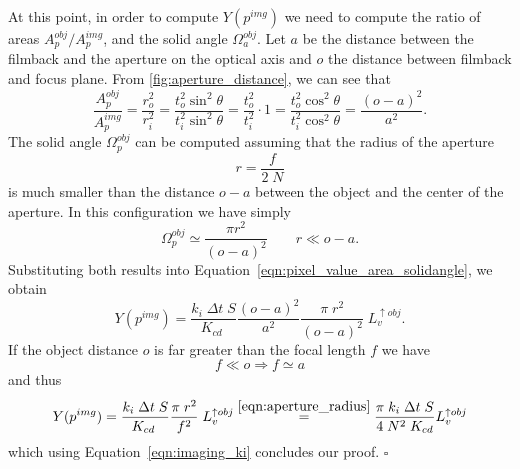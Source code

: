 At this point, in order to compute $Y(p^{img})$ we need to compute the ratio of
areas $A_p^{obj}/A_p^{img}$, and the solid angle $\Omega_a^{obj}$. Let $a$ be the distance between the filmback and the
aperture on the optical axis and $o$ the distance between filmback and focus
plane. From \cref{fig:aperture_distance}, we can see that
\begin{equation*}
    \frac{A_p^{obj}}{A^{img}_p}
    = \frac{r_o^2}{r_i^2}
    = \frac{t_o^2 \sin^2\theta}{t_i^2 \sin^2\theta}
    = \frac{t_o^2}{t_i^2} \cdot 1
    = \frac{t_o^2 \cos^2\theta}{t_i^2 \cos^2\theta}
    = \frac{(o-a)^2}{a^2}.
\end{equation*}
The solid angle $\Omega_p^{obj}$ can be computed assuming that the radius of the
aperture 
\begin{equation}\label{eqn:aperture_radius}
    r = \frac{f}{2\;N}
\end{equation}
is much smaller than the distance $o-a$ between the object
and the center of the aperture. In this configuration we have simply
\begin{equation}\label{eqn:imaging_omegapobj}
\Omega_p^{obj} \simeq \frac{\pi r^2}{(o-a)^2} \qquad r \ll o-a.
\end{equation}
Substituting both results into Equation~\eqref{eqn:pixel_value_area_solidangle}, we obtain
\begin{equation}\label{eqn:imaging_y2}
Y(p^{img}) =  \frac{k_i\; \Delta t \; S}{K_{cd}\;} \frac{(o-a)^2}{a^2} \frac{\pi\;r^2}{(o-a)^2}\; L_v^{\uparrow obj}.
\end{equation}
If the object distance $o$ is far greater than the focal length $f$ we have
\begin{equation}
f \ll o \Rightarrow  f \simeq a
\end{equation}
and thus
\begin{equation}
  Y(p^{img}) =  \frac{k_i\; \Delta t \; S}{K_{cd}\;} \frac{\pi\;r^2}{f^2}\; L_v^{\uparrow obj} \stackrel{\eqref{eqn:aperture_radius}}{=}
   \frac{\pi\; k_i\; \Delta t \; S}{4\;N^2\;K_{cd}} L_v^{\uparrow obj} 
\end{equation}
which using Equation~\eqref{eqn:imaging_ki} concludes our proof. \hfill $\square$

%   

